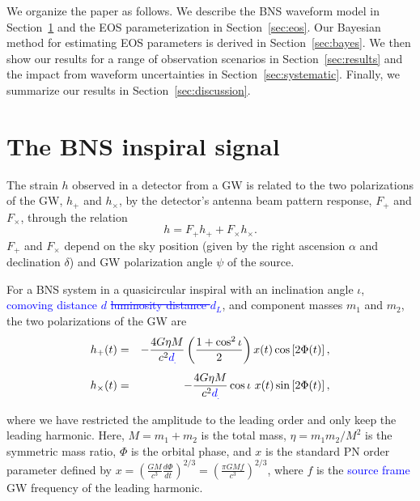 \documentclass[twocolumn,prd,amssymb,aps,nofootinbib,showpacs,epsf]{revtex4}
\newcommand\les[2]{\textcolor{blue}{{#1}\sout{#2}}}
\begin{document}
We organize the paper as follows. We describe the BNS waveform model in Section~\ref{sec:waveform} and the EOS parameterization in Section~\ref{sec:eos}. Our Bayesian method for estimating EOS parameters is derived in Section~\ref{sec:bayes}. We then show our results for a range of observation scenarios in Section~\ref{sec:results} and the impact from waveform uncertainties in Section~\ref{sec:systematic}. Finally, we summarize our results in Section~\ref{sec:discussion}.

\section{The BNS inspiral signal}
\label{sec:waveform}

The strain $h$ observed in a detector from a GW is related to the two polarizations of the GW, $h_+$ and $h_\times$, by the detector's antenna beam pattern response, $F_+$ and $F_\times$, through the relation
\begin{equation}
h = F_+ h_+ + F_\times h_\times.
\end{equation}
$F_+$ and $F_\times$ depend on the sky position (given by the right ascension $\alpha$ and declination $\delta$) and GW polarization angle $\psi$ of the source.

For a BNS system in a quasicircular inspiral with an inclination angle $\iota$, \les{comoving distance $d$ }{luminosity distance $d_L$}, and component masses $m_1$ and $m_2$, the two polarizations of the GW are
\begin{eqnarray}
\label{eq:hoftp}
h_+(t)&=&-\frac{4G\eta M}{c^2 \les{d}{}}\left(\frac{1+\cos^2\iota}{2}\right)x(t)\cos\left[2\Phi(t)\right],\\
\label{eq:hoftc}
h_\times(t)&=&-\frac{4G\eta M}{c^2 \les{d}{}}\cos\iota\mbox{ }x(t)\sin\left[2\Phi(t)\right],
\end{eqnarray}
where we have restricted the amplitude to the leading order and only keep the leading harmonic. Here, $M=m_1+m_2$ is the total mass, $\eta=m_1 m_2/M^2$ is the symmetric mass ratio, $\Phi$ is the orbital phase, and $x$ is the standard PN order parameter defined by $x = \left( \frac{GM}{c^3}\frac{d\Phi}{dt} \right)^{2/3} = \left( \frac{\pi GM f}{c^3} \right)^{2/3}$, where $f$ is the \les{source frame}{} GW frequency of the leading harmonic.
\end{document}

